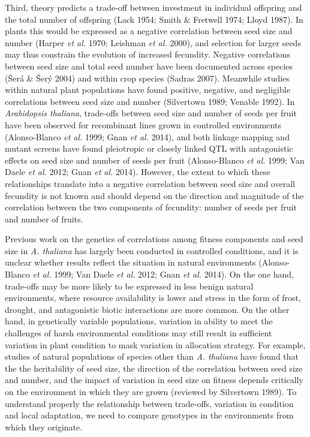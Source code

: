 \documentclass[]{article}
\begin{document}
Third, theory predicts a trade-off between investment in individual offspring and the total number of offspring (Lack 1954; Smith \& Fretwell 1974; Lloyd 1987). In plants this would be expressed as a negative correlation between seed size and number (Harper \emph{et al.} 1970; Leishman \emph{et al.} 2000), and selection for larger seeds may thus constrain the evolution of increased fecundity. Negative correlations between seed size and total seed number have been documented across species (Šerá \& Šerý 2004) and within crop species (Sadras 2007). Meanwhile studies within natural plant populations have found positive, negative, and negligible correlations between seed size and number (Silvertown 1989; Venable 1992). In \emph{Arabidopsis thaliana}, trade-offs between seed size and number of seeds per fruit have been observed for recombinant lines grown in controlled environments (Alonso-Blanco \emph{et al.} 1999; Gnan \emph{et al.} 2014), and both linkage mapping and mutant screens have found pleiotropic or closely linked QTL with antagonistic effects on seed size and number of seeds per fruit (Alonso-Blanco \emph{et al.} 1999; Van Daele \emph{et al.} 2012; Gnan \emph{et al.} 2014). However, the extent to which these relationships translate into a negative correlation between seed size and overall fecundity is not known and should depend on the direction and magnitude of the correlation between the two components of fecundity: number of seeds per fruit and number of fruits.

Previous work on the genetics of correlations among fitness components and seed size in \emph{A. thaliana} has largely been conducted in controlled conditions, and it is unclear whether results reflect the situation in natural environments (Alonso-Blanco \emph{et al.} 1999; Van Daele \emph{et al.} 2012; Gnan \emph{et al.} 2014). On the one hand, trade-offs may be more likely to be expressed in less benign natural environments, where resource availability is lower and stress in the form of frost, drought, and antagonistic biotic interactions are more common. On the other hand, in genetically variable populations, variation in ability to meet the challenges of harsh environmental conditions may still result in sufficient variation in plant condition to mask variation in allocation strategy. For example, studies of natural populations of species other than \emph{A. thaliana} have found that the the heritability of seed size, the direction of the correlation between seed size and number, and the impact of variation in seed size on fitness depends critically on the environment in which they are grown (reviewed by Silvertown 1989). To understand properly the relationship between trade-offs, variation in condition and local adaptation, we need to compare genotypes in the environments from which they originate.
\end{document}
